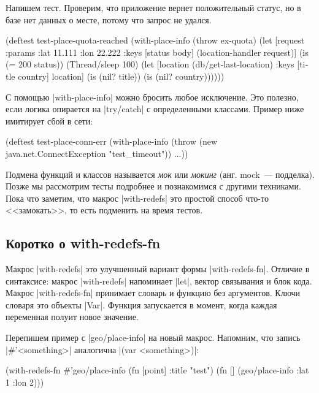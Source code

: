 Напишем тест. Проверим, что приложение вернет положительный статус, но в базе
нет данных о месте, потому что запрос не удался.

\begin{english}
  \begin{clojure}
(deftest test-place-quota-reached
  (with-place-info (throw ex-quota)
    (let [request {:params {:lat 11.111 :lon 22.222}}
          {:keys [status body]} (location-handler request)]
      (is (= 200 status))
      (Thread/sleep 100)
      (let [location (db/get-last-location)
            {:keys [title country]} location]
        (is (nil? title))
        (is (nil? country))))))
  \end{clojure}
\end{english}

С помощью \spverb|with-place-info| можно бросить любое исключение. Это полезно,
если логика опирается на \spverb|try/catch| с определенными классами. Пример
ниже имитирует сбой в сети:

\begin{english}
  \begin{clojure}
(deftest test-place-conn-err
  (with-place-info
    (throw (new java.net.ConnectException "test_timeout"))
    ...))
  \end{clojure}
\end{english}

Подмена функций и классов называется \emph{мок} или \emph{мокинг} (анг. mock~---
подделка). Позже мы рассмотрим тесты подробнее и познакомимся с другими
техниками. Пока что заметим, что макрос \spverb|with-redefs| это простой способ
что-то <<замокать>>, то есть подменить на время тестов.

\subsection{Коротко о with-redefs-fn}

Макрос \spverb|with-redefs| это улучшенный вариант формы
\spverb|with-redefs-fn|. Отличие в синтаксисе: макрос \spverb|with-redefs|
напоминает \spverb|let|, вектор связывания и блок кода. Макрос
\spverb|with-redefs-fn| принимает словарь и функцию без аргументов. Ключи
словаря это объекты \spverb|Var|. Функция запускается в момент, когда каждая
переменная полуит новое значение.

Перепишем пример с \spverb|geo/place-info| на новый макрос. Напомним, что запись
\spverb|#'<something>| аналогична \spverb|(var <something>)|:

\begin{english}
  \begin{clojure}
(with-redefs-fn
  {#'geo/place-info (fn [point] {:title "test"})}
  (fn []
    (geo/place-info {:lat 1 :lon 2})))
  \end{clojure}
\end{english}

